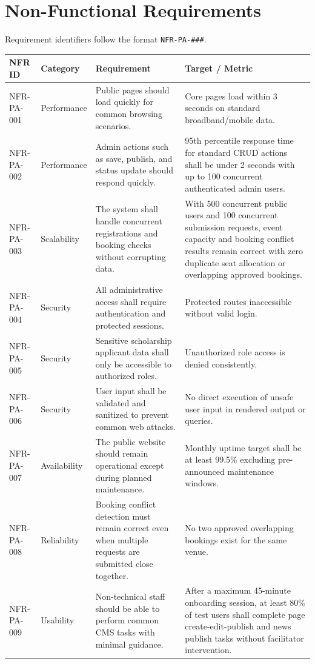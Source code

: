 \documentclass[12pt,a4paper]{article}
\newcommand{\thead}[1]{\textbf{\color{white}#1}}
\newcommand{\theadrow}{\rowcolor{headerblue}}
\begin{document}
\section{Non-Functional Requirements}

Requirement identifiers follow the format \texttt{NFR-PA-\#\#\#}.

\begin{longtable}{@{}L{2.1cm}L{2.5cm}L{6.4cm}L{3.1cm}@{}}
\theadrow \thead{NFR ID} & \thead{Category} & \thead{Requirement} & \thead{Target / Metric} \\
\endhead
NFR-PA-001 & Performance & Public pages should load quickly for common browsing scenarios. & Core pages load within 3 seconds on standard broadband/mobile data. \\
NFR-PA-002 & Performance & Admin actions such as save, publish, and status update should respond quickly. & 95th percentile response time for standard CRUD actions shall be under 2 seconds with up to 100 concurrent authenticated admin users. \\
NFR-PA-003 & Scalability & The system shall handle concurrent registrations and booking checks without corrupting data. & With 500 concurrent public users and 100 concurrent submission requests, event capacity and booking conflict results remain correct with zero duplicate seat allocation or overlapping approved bookings. \\
NFR-PA-004 & Security & All administrative access shall require authentication and protected sessions. & Protected routes inaccessible without valid login. \\
NFR-PA-005 & Security & Sensitive scholarship applicant data shall only be accessible to authorized roles. & Unauthorized role access is denied consistently. \\
NFR-PA-006 & Security & User input shall be validated and sanitized to prevent common web attacks. & No direct execution of unsafe user input in rendered output or queries. \\
NFR-PA-007 & Availability & The public website should remain operational except during planned maintenance. & Monthly uptime target shall be at least 99.5\% excluding pre-announced maintenance windows. \\
NFR-PA-008 & Reliability & Booking conflict detection must remain correct even when multiple requests are submitted close together. & No two approved overlapping bookings exist for the same venue. \\
NFR-PA-009 & Usability & Non-technical staff should be able to perform common CMS tasks with minimal guidance. & After a maximum 45-minute onboarding session, at least 80\% of test users shall complete page create-edit-publish and news publish tasks without facilitator intervention. \\

\end{longtable}
\end{document}
